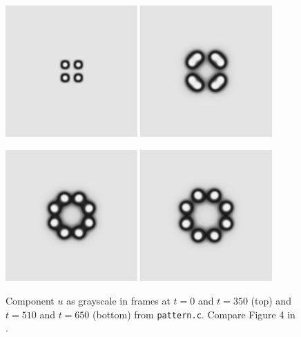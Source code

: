 \begin{figure}
\includegraphics[width=0.45\textwidth]{figs/pattern000} \quad
\includegraphics[width=0.45\textwidth]{figs/pattern350}

\medskip \medskip
\includegraphics[width=0.45\textwidth]{figs/pattern510} \quad
\includegraphics[width=0.45\textwidth]{figs/pattern650}
\caption{Component $u$ as grayscale in frames at $t=0$ and $t=350$ (top) and $t=510$ and $t=650$ (bottom) from \texttt{pattern.c}.  Compare Figure 4 in \citep{Pearson1993}.}
\label{fig:ts:pattern:pearson}
\end{figure}

